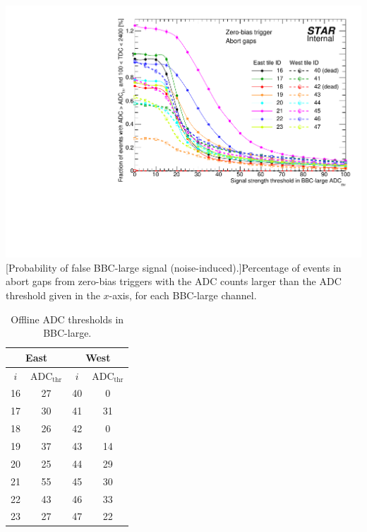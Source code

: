 \begin{table}
	\begin{minipage}{0.65\linewidth}
		\centering
		\includegraphics[width=\linewidth]{graphics/eventSelection/bbc/BbbLargeThreshold.pdf}
		[Probability of false BBC-large signal (noise-induced).]{Percentage of events in abort gaps from zero-bias triggers with the ADC counts larger than the ADC threshold given in the $x$-axis, for each BBC-large channel.}
		\label{fig:bbcLargeThresholds}
	\end{minipage}\hfill
	\begin{minipage}{0.3\linewidth}
		\centering
		\begin{tabular}{c|c||c|c}
			\multicolumn{2}{c||}{East} & \multicolumn{2}{c}{West} \\ \hline
			$i$  & $\text{ADC}_{\text{thr}}$ & $i$  & $\text{ADC}_{\text{thr}}$ \\ \hline
			16 & 27 & 40 & 0 \\
			17 & 30 & 41 & 31 \\
			18 & 26 & 42 & 0 \\
			19 & 37 & 43 & 14 \\
			20 & 25 & 44 & 29 \\
			21 & 55 & 45 & 30 \\
			22 & 43 & 46 & 33 \\
			23 & 27 & 47 & 22 \\
		\end{tabular}
		\caption[Offline ADC thresholds in BBC-large.]{Offline ADC thresholds in BBC-large.\newline\newline\newline\newline\newline\newline\newline\newline}
		\label{tab:bbcLargeThresholds}
	\end{minipage}

\end{table}



